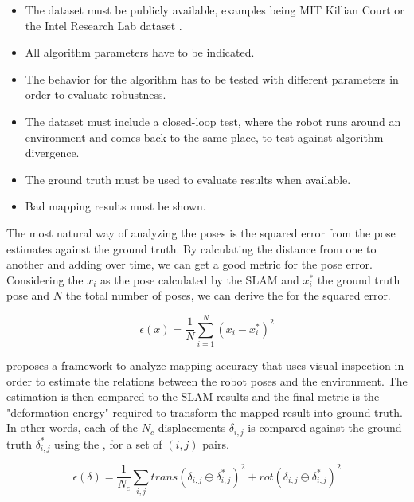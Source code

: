 \begin{itemize}
    \item The dataset must be publicly available, examples being MIT Killian Court or the Intel Research Lab dataset \cite{kummerle2009measuring}.
    \item All algorithm parameters have to be indicated.
    \item The behavior for the algorithm has to be tested with different parameters in order to evaluate robustness.
    \item The dataset must include a closed-loop test, where the robot runs around an environment and comes back to the same place, to test against algorithm divergence.
    \item The ground truth must be used to evaluate results when available.
    \item Bad mapping results must be shown.
\end{itemize}

The most natural way of analyzing the poses is the squared error from the pose estimates against the ground truth. By calculating the distance from one to another and adding over time, we can get a good metric for the pose error. Considering the $x_i$ as the pose calculated by the SLAM and $x_i^*$ the ground truth pose and $N$ the total number of poses, we can derive the  for the squared error.

\begin{equation}\label{eq:error_squared}
\epsilon(x) = \frac{1}{N} \sum_{i = 1}^N (x_i - x_i^*)^2
\end{equation}

\citeauthor{kummerle2009measuring} proposes a framework to analyze mapping accuracy that uses visual inspection in order to estimate the relations between the robot poses and the environment. The estimation is then compared to the SLAM results and the final metric is the "deformation energy" required to transform the mapped result into ground truth. In other words, each of the $N_c$ displacements $\delta_{i,j}$ is compared against the ground truth $\delta_{i,j}^*$ using the , for a set of  $(i,j)$ pairs.

\begin{equation}\label{eq:displacement}
    \epsilon(\delta) = \frac{1}{N_c} \sum_{i, j} trans(\delta_{i,j} \ominus \delta_{i,j}^*)^2 + rot(\delta_{i,j} \ominus \delta_{i,j}^*)^2
\end{equation}

